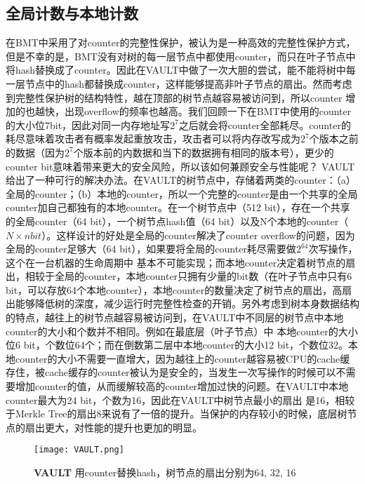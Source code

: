 \subsection{全局计数与本地计数}
在BMT中采用了对counter的完整性保护，被认为是一种高效的完整性保护方式，但是不幸的是，BMT没有对树的每一层节点中都使用counter，而只在叶子节点中将hash替换成了counter。因此在VAULT中做了一次大胆的尝试，能不能将树中每一层节点中的hash都替换成counter，这样能够提高非叶子节点的扇出。然而考虑到完整性保护树的结构特性，越在顶部的树节点越容易被访问到，所以counter
增加的也越快，出现overflow的频率也越高。我们回顾一下在BMT中使用的counter的大小位7bit，因此对同一内存地址写$2^7$之后就会将counter全部耗尽。counter的耗尽意味着攻击者有概率发起重放攻击，攻击者可以将内存改写成为$2^7$个版本之前的数据（因为$2^7$个版本前的内数据和当下的数据拥有相同的版本号），更少的counter bit意味着带来更大的安全风险，所以该如何兼顾安全与性能呢？
VAULT给出了一种可行的解决办法。在VAULT的树节点中，存储着两类的counter：（a）全局的counter；（b）本地的counter，所以一个完整的counter是由一个共享的全局counter加自己都独有的本地counter。在一个树节点中（512 bit），存在一个共享的全局counter（64 bit），一个树节点hash值（64 bit）以及N个本地的counter（$N\times n bit$）。这样设计的好处是全局的counter解决了counter overflow的问题，因为全局的counter足够大（64 bit），如果要将全局的counter耗尽需要做$2^{64}$次写操作，这个在一台机器的生命周期中
基本不可能实现；而本地counter决定着树节点的扇出，相较于全局的counter，本地counter只拥有少量的bit数（在叶子节点中只有6 bit，可以存放64个本地counter），本地counter的数量决定了树节点的扇出，高扇出能够降低树的深度，减少运行时完整性检查的开销。另外考虑到树本身数据结构的特点，越往上的树节点越容易被访问到，在VAULT中不同层的树节点中本地counter的大小和个数并不相同。例如在最底层（叶子节点）中
本地counter的大小位6 bit，个数位64个；而在倒数第二层中本地counter的大小12 bit，个数位32。本地counter的大小不需要一直增大，因为越往上的counter越容易被CPU的cache缓存住，被cache缓存的counter被认为是安全的，当发生一次写操作的时候可以不需要增加counter的值，从而缓解较高的counter增加过快的问题。在VAULT中本地counter最大为24 bit，个数为16，因此在VAULT中树节点最小的扇出
是16，相较于Merkle Tree的扇出8来说有了一倍的提升。当保护的内存较小的时候，底层树节点的扇出更大，对性能的提升也更加的明显。

\begin{figure}[!htp]
    \centering
    \texttt{[image: VAULT.png]}
    \caption{\textbf{VAULT }用counter替换hash，树节点的扇出分别为64, 32, 16}
   \label{fig: VAULT.png}
\end{figure}
